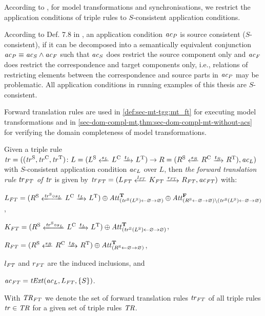 According to \cite{FAGT2}, for model transformations and synchronisations, we restrict the application conditions of triple rules to $S$-consistent application conditions.

\begin{remark}
\label{rem:sec-mt-tgg:s_consistent}
According to Def. 7.8 in \cite{FAGT2}, an application condition $\mathit{ac}_P$ is source consistent ($S$-consistent), if it can be decomposed into a semantically equivalent conjunction $\mathit{ac}_P \equiv \mathit{ac}_S \wedge \mathit{ac}_F$ such that $\mathit{ac}_S$ does restrict the source component only and $\mathit{ac}_F$ does restrict the correspondence and target components only, i.e., relations of restricting elements between the correspondence and source parts in $\mathit{ac}_P$ may be problematic.
All application conditions in running examples of this thesis are $S$-consistent.
\envEndMarker
\end{remark}

Forward translation rules are used in \cref{def:sec-mt-tgg:mt_ft} for executing model transformations and in \cref{sec-dom-compl-mt,thm:sec-dom-compl-mt-without-acs} for verifying the domain completeness of model transformations.

\begin{definition}
\label{def:sec-mt-tgg:fwd_bwd_tr_rules}
Given a triple rule $\tr=((\tr^\SRC,\tr^\C,\tr^\T)\colon L=(L^\SRC \transB{s_L} L^\C \trans{t_L} L^\T) \to R=(R^\SRC \transB{s_R} R^\C \trans{t_R} R^\T),\ac_L)$ with $S$-consistent application condition $\mathit{ac}_L$ over $L$, then \emph{the forward translation rule $\mathit{tr}_\mathit{FT}$ of $\mathit{tr}$} is given by $\tr_\FT=(L_\FT \transB{l_\FT} K_\FT \trans{r_\FT} R_\FT,\ac_\FT)$ with:
\begin{enumerate*}
  \item $L_\FT=(R^\SRC \transB{\tr^\SRC \circ s_L} L^\C \trans{t_L} L^\T) \oplus \Att^\True_{(\tr^\SRC(L^\SRC) \gets \varnothing \to \varnothing)} \oplus \Att^\False_{(R^\SRC \gets \varnothing \to \varnothing) \setminus (\tr^\SRC(L^\SRC) \gets \varnothing \to \varnothing)}$,
  \item $K_\FT=(R^\SRC \transB{\tr^\SRC \circ s_L} L^\C \trans{t_L} L^\T) \oplus \Att^\True_{(\tr^\SRC(L^\SRC) \gets \varnothing \to \varnothing)}$,
  \item $R_\FT=(R^\SRC \transB{s_R} R^\C \trans{t_R} R^\T) \oplus \Att^\True_{(R^\SRC \gets \varnothing \to \varnothing)}$,
  \item $l_\mathit{FT}$ and $r_\mathit{FT}$ are the induced inclusions, and
  \item $\mathit{ac}_\mathit{FT}=\mathit{tExt}(\mathit{ac}_L,L_\mathit{FT},\{S\})$.
\end{enumerate*}
With $\mathit{TR}_\mathit{FT}$ we denote the set of forward translation rules $\mathit{tr}_\mathit{FT}$ of all triple rules $\mathit{tr} \in \mathit{TR}$ for a given set of triple rules $\mathit{TR}$.
\envEndMarker
\end{definition}

